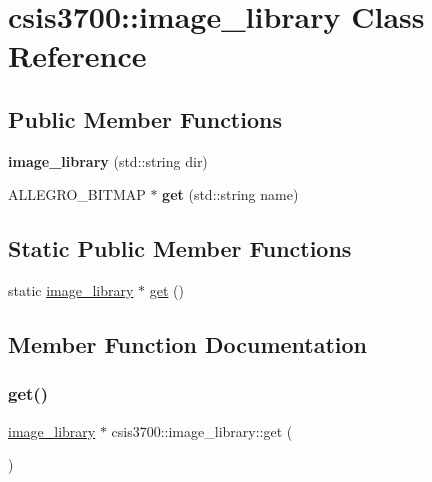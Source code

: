 \hypertarget{classcsis3700_1_1image__library}{}\section{csis3700\+:\+:image\+\_\+library Class Reference}
\label{classcsis3700_1_1image__library}
\subsection*{Public Member Functions}
\begin{DoxyCompactItemize}
\item 
\mbox{\label{classcsis3700_1_1image__library_adea94b7de53bcbedb0612286285521e0}} 
{\bfseries image\+\_\+library} (std\+::string dir)
\item 
\mbox{\label{classcsis3700_1_1image__library_a40e4bc8bf2b83ef1e86acef16943ddf5}} 
A\+L\+L\+E\+G\+R\+O\+\_\+\+B\+I\+T\+M\+AP $\ast$ {\bfseries get} (std\+::string name)
\end{DoxyCompactItemize}
\subsection*{Static Public Member Functions}
\begin{DoxyCompactItemize}
\item 
static \hyperlink{classcsis3700_1_1image__library}{image\+\_\+library} $\ast$ \hyperlink{classcsis3700_1_1image__library_a893d19ef45701db38a502f54924eed44}{get} ()
\end{DoxyCompactItemize}


\subsection{Member Function Documentation}
\mbox{\label{classcsis3700_1_1image__library_a893d19ef45701db38a502f54924eed44}} 
\subsubsection{\texorpdfstring{get()}{get()}}
{\footnotesize\ttfamily \hyperlink{classcsis3700_1_1image__library}{image\+\_\+library} $\ast$ csis3700\+::image\+\_\+library\+::get (\begin{DoxyParamCaption}{ }\end{DoxyParamCaption})\hspace{0.3cm}{\ttfamily [static]}}

